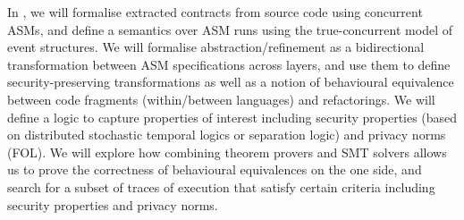 \begin{Workpackage}{\thewpno}
\begin{Task}
\end{Task}

\begin{Task}

\TaskResults{%
}
\TaskHeader{}

In \theTask, we will formalise extracted contracts from source code using concurrent ASMs, and define a semantics over ASM runs using the true-concurrent model of event structures. 
We will formalise abstraction/refinement as a bidirectional transformation between ASM specifications across layers, and use them to define 
security-preserving transformations as well as a notion of behavioural equivalence between code fragments (within/between languages) and refactorings.
We will define a logic to capture properties of interest  including security properties (based on distributed stochastic temporal logics or separation
logic) and privacy norms (FOL).
We will explore how combining theorem provers and SMT solvers allows us to prove the correctness of behavioural equivalences on the one side, and search for a subset of traces of execution that satisfy certain criteria including security properties and privacy norms.

\end{Task}



\begin{Task}

\TaskResults{%
}
\TaskHeader{}


\end{Task}
\end{Workpackage}
